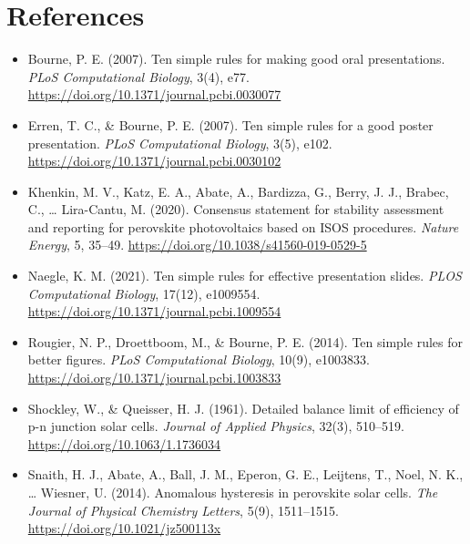\section*{References}

\begin{itemize}
\item Bourne, P. E. (2007). Ten simple rules for making good oral presentations. \textit{PLoS Computational Biology}, 3(4), e77. \url{https://doi.org/10.1371/journal.pcbi.0030077}
\item Erren, T. C., \& Bourne, P. E. (2007). Ten simple rules for a good poster presentation. \textit{PLoS Computational Biology}, 3(5), e102. \url{https://doi.org/10.1371/journal.pcbi.0030102}
\item Khenkin, M. V., Katz, E. A., Abate, A., Bardizza, G., Berry, J. J., Brabec, C., \ldots{} Lira-Cantu, M. (2020). Consensus statement for stability assessment and reporting for perovskite photovoltaics based on ISOS procedures. \textit{Nature Energy}, 5, 35--49. \url{https://doi.org/10.1038/s41560-019-0529-5}
\item Naegle, K. M. (2021). Ten simple rules for effective presentation slides. \textit{PLOS Computational Biology}, 17(12), e1009554. \url{https://doi.org/10.1371/journal.pcbi.1009554}
\item Rougier, N. P., Droettboom, M., \& Bourne, P. E. (2014). Ten simple rules for better figures. \textit{PLoS Computational Biology}, 10(9), e1003833. \url{https://doi.org/10.1371/journal.pcbi.1003833}
\item Shockley, W., \& Queisser, H. J. (1961). Detailed balance limit of efficiency of p-n junction solar cells. \textit{Journal of Applied Physics}, 32(3), 510--519. \url{https://doi.org/10.1063/1.1736034}
\item Snaith, H. J., Abate, A., Ball, J. M., Eperon, G. E., Leijtens, T., Noel, N. K., \ldots{} Wiesner, U. (2014). Anomalous hysteresis in perovskite solar cells. \textit{The Journal of Physical Chemistry Letters}, 5(9), 1511--1515. \url{https://doi.org/10.1021/jz500113x}
\end{itemize}
